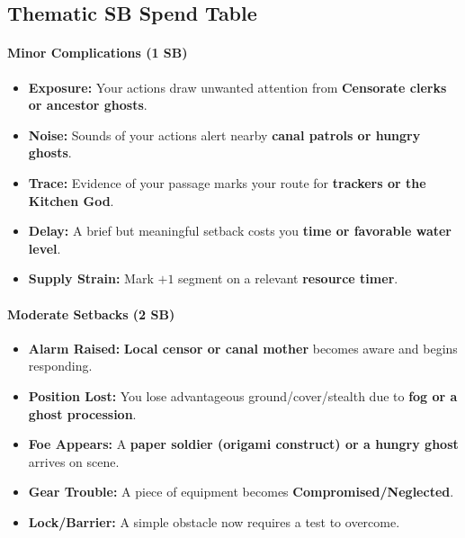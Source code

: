 \subsection*{Thematic SB Spend Table}
\label{sec:sihai-sb}

\paragraph{Minor Complications (1 SB)}
\begin{itemize}
\item \textbf{Exposure:} Your actions draw unwanted attention from \textbf{Censorate clerks or ancestor ghosts}.
\item \textbf{Noise:} Sounds of your actions alert nearby \textbf{canal patrols or hungry ghosts}.
\item \textbf{Trace:} Evidence of your passage marks your route for \textbf{trackers or the Kitchen God}.
\item \textbf{Delay:} A brief but meaningful setback costs you \textbf{time or favorable water level}.
\item \textbf{Supply Strain:} Mark $+1$ segment on a relevant \textbf{resource timer}.
\end{itemize}

\paragraph{Moderate Setbacks (2 SB)}
\begin{itemize}
\item \textbf{Alarm Raised:} \textbf{Local censor or canal mother} becomes aware and begins responding.
\item \textbf{Position Lost:} You lose advantageous ground/cover/stealth due to \textbf{fog or a ghost procession}.
\item \textbf{Foe Appears:} A \textbf{paper soldier (origami construct) or a hungry ghost} arrives on scene.
\item \textbf{Gear Trouble:} A piece of equipment becomes \textbf{Compromised/Neglected}.
\item \textbf{Lock/Barrier:} A simple obstacle now requires a test to overcome.
\end{itemize}

